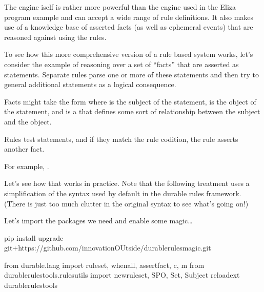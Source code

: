\documentclass[letterpaper,10pt,english]{sphinxmanual}
\begin{document}
The engine iself is rather more powerful than the engine used in the Eliza program example and can accept a wide range of rule definitions. It also makes use of a knowledge base of asserted facts (as well as ephemeral events) that are reasoned against using the rules.

To see how this more comprehensive version of a rule based system works, let’s consider the example of reasoning over a set of “facts” that are asserted as  statements. Separate rules parse one or more of these statements and then try to general additional statements as a logical consequence.

Facts might take the form  where  is the subject of the statement,  is the object of the statement, and  is a  that defines some sort of relationship between the subject and the object.

Rules test statements, and if they match the rule codition, the rule asserts another fact.

For example, .

Let’s see how that works in practice. Note that the following treatment uses a simplification of the syntax used by default in the durable rules framework. (There is just too much clutter in the original syntax to see what’s going on!)

Let’s import the packages we need and enable some magic…

{
\begin{sphinxVerbatim}[commandchars=\\\{\}]
\llap{\color{nbsphinxin}[ ]:\,\hspace{\fboxrule}\hspace{\fboxsep}}\PYGZsh{}\PYGZpc{}pip install  \PYGZhy{}\PYGZhy{}upgrade git+https://github.com/innovationOUtside/durable\PYGZus{}rules\PYGZus{}magic.git
\end{sphinxVerbatim}
}

{
\begin{sphinxVerbatim}[commandchars=\\\{\}]
\llap{\color{nbsphinxin}[ ]:\,\hspace{\fboxrule}\hspace{\fboxsep}}from durable.lang import ruleset, when\PYGZus{}all, assert\PYGZus{}fact, c, m
from durable\PYGZus{}rules\PYGZus{}tools.rules\PYGZus{}utils import new\PYGZus{}ruleset, SPO, Set, Subject
\PYGZpc{}reload\PYGZus{}ext durable\PYGZus{}rules\PYGZus{}tools
\end{sphinxVerbatim}
}
\end{document}
